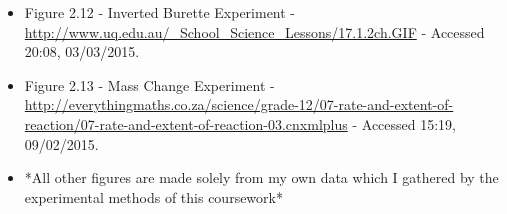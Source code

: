 \begin{itemize}
\item Figure 2.12 - Inverted Burette Experiment - \url{http://www.uq.edu.au/_School_Science_Lessons/17.1.2ch.GIF} - Accessed 20:08, 03/03/2015.

\item Figure 2.13 - Mass Change Experiment - \url{http://everythingmaths.co.za/science/grade-12/07-rate-and-extent-of-reaction/07-rate-and-extent-of-reaction-03.cnxmlplus} - Accessed 15:19, 09/02/2015.



\item *All other figures are made solely from my own data which I gathered by the experimental methods of this coursework*









\end{itemize}